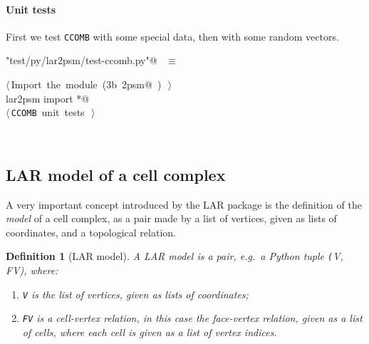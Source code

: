 \documentclass[11pt,oneside]{article}	%
\newtheorem{definition}{Definition}
\begin{document}
\paragraph{Unit tests}
First we test \texttt{CCOMB} with some special data, then with some random vectors.
\begin{flushleft} \small
\begin{minipage}{\linewidth} \label{scrap5}
\verb@"test/py/lar2psm/test-ccomb.py"@\nobreak\ {\footnotesize {} }$\equiv$
\vspace{-1ex}
\begin{list}{}{} \item
\mbox{}\verb@@\hbox{$\langle\,$Import the module\nobreak\ ({\footnotesize 3b\label{scrap6}
 }\mbox{}\verb@lar2psm@ ) {\footnotesize {}}$\,\rangle$}\verb@@\\
\mbox{}\verb@from lar2psm import *@\\
\mbox{}\verb@@\hbox{$\langle\,$\texttt{CCOMB} unit tests\nobreak\ {\footnotesize {}}$\,\rangle$}\verb@@\\
\mbox{}\verb@@{\NWsep}
\end{list}
\vspace{-2ex}
\end{minipage}\\[4ex]
\end{flushleft}

\subsection{LAR model of a cell complex}

A very important concept introduced by the LAR package is the definition of the \emph{model} of a cell complex, as a pair made by a list of vertices, given as lists of coordinates, and a topological relation.

\begin{definition}[LAR model]
A \emph{LAR model} is a pair, e.g.~a Python tuple \emph{\texttt(V, FV)}, where:
\begin{enumerate}
\item \texttt{V} is the list of vertices, given as lists of coordinates;
\item \texttt{FV} is a \emph{cell-vertex} relation, in this case the face-vertex relation, given as a list of cells, where each cell is given as a list of vertex indices.
\end{enumerate}
\end{definition}
\end{document}
